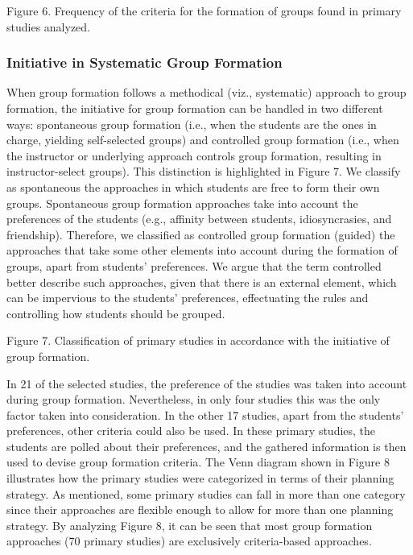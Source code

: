 Figure 6. Frequency of the criteria for the formation of groups found in primary studies analyzed.

\subsubsection{Initiative in Systematic Group Formation}

When group formation follows a methodical (viz., systematic) approach to group formation, the initiative for group formation can be handled in two different ways: spontaneous group formation (i.e., when the students are the ones in charge, yielding self-selected groups) and controlled group formation (i.e., when the instructor or underlying approach controls group formation, resulting in instructor-select groups). This distinction is highlighted in Figure 7. We classify as spontaneous the approaches in which students are free to form their own groups. Spontaneous group formation approaches take into account the preferences of the students (e.g., affinity between students, idiosyncrasies, and friendship). Therefore, we classified as controlled group formation (guided) the approaches that take some other elements into account during the formation of groups, apart from students’ preferences. We argue that the term controlled better describe such approaches, given that there is an external element, which can be impervious to the students’ preferences, effectuating the rules and controlling how students should be grouped.
 
Figure 7. Classification of primary studies in accordance with the initiative of group formation.

In 21 of the selected studies, the preference of the studies was taken into account during group formation. Nevertheless, in only four studies this was the only factor taken into consideration. In the other 17 studies, apart from the students’ preferences, other criteria could also be used. In these primary studies, the students are polled about their preferences, and the gathered information is then used to devise group formation criteria.
The Venn diagram shown in Figure 8 illustrates how the primary studies were categorized in terms of their planning strategy. As mentioned, some primary studies can fall in more than one category since their approaches are flexible enough to allow for more than one planning strategy. By analyzing Figure 8, it can be seen that most group formation approaches (70 primary studies) are exclusively criteria-based approaches.

